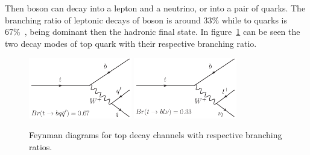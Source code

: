 Then \W boson can decay into a lepton and a neutrino, or into a pair of quarks. The branching ratio of leptonic decays of \W boson is around 33\% while to quarks is 67\%~\cite{Agashe:2014kda}, being dominant then the hadronic final state. In figure~\ref{fig:BRratiosandDecayChannels} can be seen the two decay modes of top quark with their respective branching ratio. 

\begin{figure}[!Hhtbp]
  \begin{center}
    \includegraphics[width=0.4\textwidth]{figs/Top_H_Decay.png}
    \includegraphics[width=0.4\textwidth]{figs/Top_L_Decay.png}
    \caption{Feynman diagrams for top decay channels with respective branching ratios.}
    \label{fig:BRratiosandDecayChannels}
  \end{center}
\end{figure}

%
%
%
%
%
%

